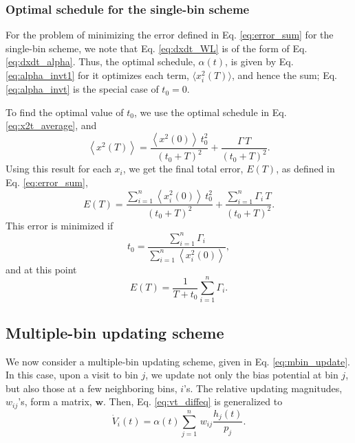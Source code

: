 \documentclass[reprint, superscriptaddress, floatfix]{revtex4-1}
\begin{document}
\subsubsection{Optimal schedule for the single-bin scheme}



For the problem of
minimizing the error defined in Eq. \eqref{eq:error_sum}
for the single-bin scheme,
we note that Eq. \eqref{eq:dxdt_WL}
is of the form of Eq. \eqref{eq:dxdt_alpha}.
%
Thus,
the optimal schedule, $\alpha(t)$, is given by
Eq. \eqref{eq:alpha_invt1}
for it optimizes each term, $\langle x_i^2(T) \rangle$,
and hence the sum;
Eq. \eqref{eq:alpha_invt}
is the special case of $t_0 = 0$.

To find the optimal value of $t_0$,
we use the optimal schedule in Eq. \eqref{eq:x2t_average},
and
$$
\left\langle x^2(T) \right\rangle
=
\frac{ \left\langle x^2(0) \right\rangle \, t_0^2 }
     { (t_0 + T)^2 }
+
\frac{ \Gamma \, T}
     { (t_0 + T)^2 }
.
$$
Using this result for each $x_i$,
we get the final total error, $E(T)$,
as defined in Eq. \eqref{eq:error_sum},
\begin{equation}
  E(T)
  =
  \frac{ \sum_{i=1}^n \left\langle x_i^2(0) \right\rangle \, t_0^2 }
       { (t_0 + T)^2 }
  +
  \frac{ \sum_{i=1}^n \Gamma_i \, T}
       { (t_0 + T)^2 }
  .
  \label{eq:error_singlebin}
\end{equation}
%
This error is minimized if
%
\begin{equation}
t_0 = \frac{ \sum_{i = 1}^n \Gamma_i }
           { \sum_{i = 1}^n \left\langle x_i^2(0) \right\rangle }
           ,
  \label{eq:t0_singlebin}
\end{equation}
%
and at this point
%
\begin{equation}
  E(T)
  =
  \frac{ 1 } { T + t_0 }
  \sum_{i = 1}^n \Gamma_i
  .
  \label{eq:Emin_singlebin}
\end{equation}



\subsection{\label{sec:multiple-bin}
Multiple-bin updating scheme}



We now consider a multiple-bin updating scheme,
given in Eq. \eqref{eq:mbin_update}.
%
In this case,
upon a visit to bin $j$,
we update not only the bias potential at bin $j$,
but also those at a few neighboring bins, $i$'s.
%
The relative updating magnitudes,
$w_{ij}$'s,
form a matrix, $\mathbf w$.
%
Then, Eq. \eqref{eq:vt_diffeq} is generalized to
%
\begin{equation}
  \dot V_i(t)
  =
  \alpha(t) \sum_{j=1}^n \, w_{ij} \frac{ h_j(t) } { p_j }.
  \label{eq:vt_diffeq_mbin}
\end{equation}
\end{document}
